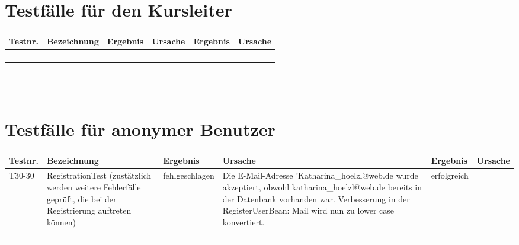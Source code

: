 \begin{landscape}
	\section{Testfälle für den Kursleiter}
		\begin{tabular}{|p{2.0cm} |p{5.0cm}|p{3.0cm}|p{5.0cm}|p{4.0cm}|p{4.0cm}|}
			\hline \textbf{Testnr.} & \textbf{Bezeichnung} & \textbf{Ergebnis} & \textbf{Ursache} & \textbf{Ergebnis} & \textbf{Ursache} \\
			\hline       &          &          &        &         &       \\
			\hline       &          &          &        &         &       \\
			\hline       &          &          &        &         &       \\
			\hline       &          &          &        &         &       \\
			\hline 
		\end{tabular} \ \\
		\ \\
				
	\section{Testfälle für anonymer Benutzer}
		\begin{tabular}{|p{2.0cm} |p{5.0cm}|p{3.0cm}|p{5.0cm}|p{4.0cm}|p{4.0cm}|}
			\hline \textbf{Testnr.} & \textbf{Bezeichnung} & \textbf{Ergebnis} & \textbf{Ursache} & \textbf{Ergebnis} & \textbf{Ursache} \\
			\hline   T30-30    & RegistrationTest (zustätzlich werden weitere Fehlerfälle geprüft, die bei der Registrierung auftreten können)   &   fehlgeschlagen       &    Die E-Mail-Adresse 'Katharina\_hoelzl@web.de wurde akzeptiert, obwohl katharina\_hoelzl@web.de bereits in der Datenbank vorhanden war. Verbesserung in der RegisterUserBean: Mail wird nun zu lower case konvertiert.    &    erfolgreich     &       \\
			\hline       &          &          &        &         &       \\
			\hline       &          &          &        &         &       \\
			\hline       &          &          &        &         &       \\
			\hline 
		\end{tabular} \ \\
		\ \\
			

\end{landscape}
